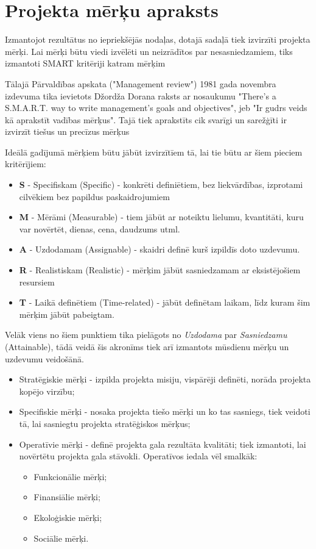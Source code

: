 \section{Projekta mērķu apraksts}
Izmantojot rezultātus no iepriekšējās nodaļas, dotajā sadaļā tiek izvirzīti projekta mērķi.
Lai mērķi būtu viedi izvēlēti un neizrādītos par nesasniedzamiem, tiks izmantoti SMART 
kritēriji katram mērķim
\par
Tālajā Pārvaldības apskata ("Management review") 1981 gada novembra izdevuma tika ievietots Džordža Dorana raksts
ar nosaukumu "There's a S.M.A.R.T. way to write management's goals and objectives", jeb "Ir gudrs veids kā aprakstīt
vadības mērķus". Tajā tiek aprakstīts cik svarīgi un sarežģīti ir izvirzīt tiešus un precīzus mērķus

Ideālā gadījumā mērķiem būtu jābūt izvirzītīem tā, lai tie būtu ar šiem pieciem kritērījiem:
\begin{itemize}
    \item \textbf{S} - Specifiskam (Specific) - konkrēti definiētiem, bez liekvārdības, izprotami cilvēkiem bez papildus paskaidrojumiem
    \item \textbf{M} - Mērāmi (Measurable) - tiem jābūt ar noteiktu lielumu, kvantitāti, kuru var novērtēt, dienas, cena, daudzums utml.
    \item \textbf{A} - Uzdodamam (Assignable) - skaidri definē kurš izpildīs doto uzdevumu.
    \item \textbf{R} - Realistiskam (Realistic) - mērķim jābūt sasniedzamam ar eksistējošiem resursiem
    \item \textbf{T} - Laikā definētiem (Time-related) - jābūt definētam laikam, līdz kuram šim mērķim jābūt pabeigtam.
\end{itemize}
Velāk viens no šiem punktiem tika pielāgots no \textit{Uzdodama} par \textit{Sasniedzamu} (Attainable), tādā veidā šis
akronīms tiek arī izmantots mūsdienu mērķu un uzdevumu veidošānā.
\par
\begin{itemize}
    \item Stratēgiskie mērķi - izpilda projekta misiju, vispārēji definēti, norāda projekta kopējo virzību;
    \item Specifiskie mērķi - nosaka projekta tiešo mērķi un ko tas sasniegs, tiek veidoti tā, lai sasniegtu projekta stratēģiskos mērķus;
    \item Operatīvie mērķi - definē projekta gala rezultāta kvalitāti; tiek izmantoti, lai novērtētu projekta gala stāvokli. Operatīvos iedala vēl smalkāk:
    \begin{itemize}
        \item Funkcionālie mērķi;
        \item Finansiālie mērķi;
        \item Ekoloģiskie mērķi;
        \item Sociālie mērķi.
    \end{itemize}
\end{itemize}
